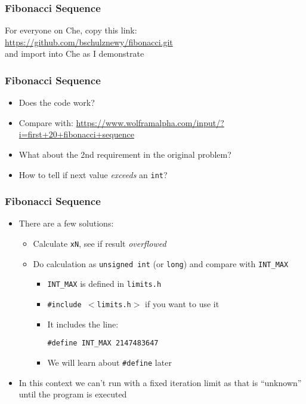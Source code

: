 \documentclass[14pt]{beamer}
\begin{document}
\begin{frame}
\frametitle{Fibonacci Sequence}
\begin{center}
For everyone on Che, copy this link:\\
\url{https://github.com/bschulznewy/fibonacci.git} \\
and import into Che as I demonstrate
\end{center}
\end{frame}

\begin{frame}
\frametitle{Fibonacci Sequence}
\begin{itemize}
\item Does the code work?
\item Compare with: \url{https://www.wolframalpha.com/input/?i=first+20+fibonacci+sequence}
\item What about the 2nd requirement in the original problem?
\item How to tell if next value \textit{exceeds} an \texttt{int}?
\end{itemize}
\end{frame}

\begin{frame}[fragile]
\frametitle{Fibonacci Sequence}
\begin{itemize}
\item There are a few solutions:
	\begin{itemize}
		\item Calculate \texttt{xN}, see if result \textit{overflowed}
		\item Do calculation as \texttt{unsigned int} (or \texttt{long}) and compare with \texttt{INT\_MAX}
		\begin{itemize}
			\item \texttt{INT\_MAX} is defined in \texttt{limits.h}
			\item \texttt{\#include $<$limits.h$>$} if you want to use it
			\item It includes the line:
			\begin{lstlisting}[style=CStyle]
#define INT_MAX	2147483647
\end{lstlisting}
			\item We will learn about \texttt{\#define} later
		\end{itemize}
	\end{itemize}
\item In this context we can't run with a fixed iteration limit as that is ``unknown'' until the program is executed
\end{itemize}
\end{frame}
\end{document}

